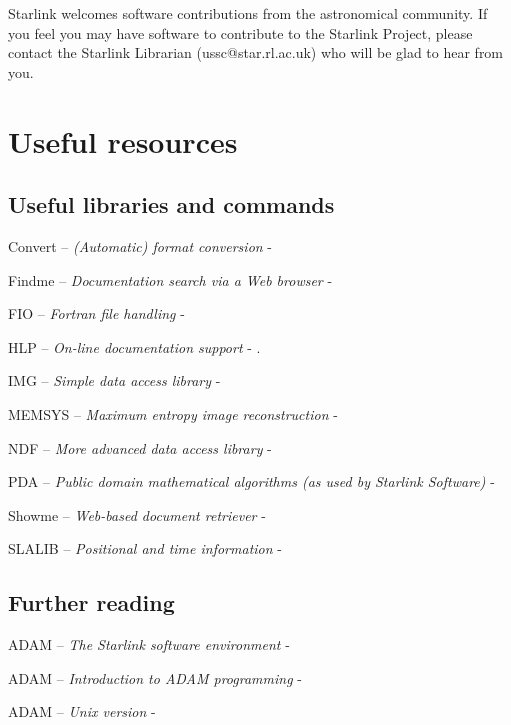 Starlink welcomes software contributions from the astronomical community.
If you feel you may have software to contribute to the Starlink Project,
please contact the Starlink Librarian ({\sf ussc@star.rl.ac.uk}) who
will be glad to hear from you.

\newpage

\appendix

\section{Useful resources}

\subsection{Useful libraries and commands}

Convert -- {\em (Automatic) format conversion} - 

Findme -- {\em Documentation search via a Web browser} -

FIO -- {\em Fortran file handling} - 

HLP -- {\em On-line documentation support} - .

IMG -- {\em Simple data access library} - 

MEMSYS -- {\em Maximum entropy image reconstruction} -

NDF -- {\em More advanced data access library} - 

PDA -- {\em Public domain mathematical algorithms (as used by Starlink
Software)} - 

Showme -- {\em Web-based document retriever} - 

SLALIB -- {\em Positional and time information} - 

\subsection{Further reading}

ADAM -- {\em The Starlink software environment} - 

ADAM -- {\em Introduction to ADAM programming} - 

ADAM -- {\em Unix version} - 

